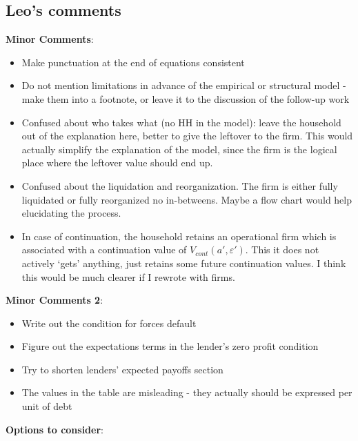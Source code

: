 \documentclass[12pt]{article}
\begin{document}
\newpage

\subsection*{Leo's comments}
\textbf{Minor Comments}:
\begin{itemize}\setlength\itemsep{0em} \small
    \item Make punctuation at the end of equations consistent
    \item Do not mention limitations in advance of the empirical or structural model - make them into a footnote, or leave it to the discussion of the follow-up work
    \item Confused about who takes what (no HH in the model):  leave the household out of the explanation here, better to give the leftover to the firm. This would actually simplify the explanation of the model, since the firm is the logical place where the leftover value should end up.
    \item Confused about the liquidation and reorganization. The firm is either fully liquidated or fully reorganized no in-betweens. Maybe a flow chart would help elucidating the process. 
    \item In case of continuation, the household retains an operational firm which is associated with a continuation value of $V_{cont}(a',\varepsilon')$. This it does not actively `gets' anything, just retains some future continuation values. I think this would be much clearer if I rewrote with firms. 
\end{itemize} \normalsize
\textbf{Minor Comments 2}:
\begin{itemize}\setlength\itemsep{0em} \small
    \item Write out the condition for forces default
    \item Figure out the expectations terms in the lender's zero profit condition
    \item Try to shorten lenders' expected payoffs section
    \item The values in the table are misleading - they actually should be expressed per unit of debt
\end{itemize} \normalsize
\textbf{Options to consider}:
\end{document}
